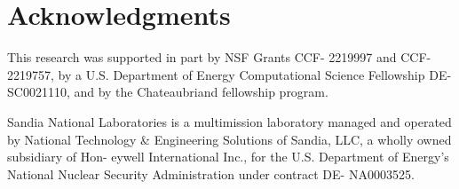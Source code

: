 \documentclass[conference]{IEEEtran}
\begin{document}














 \section{Acknowledgments}  
This research was supported in part by NSF Grants CCF-
2219997 and CCF-2219757, by a U.S. Department of Energy
Computational Science Fellowship DE-SC0021110, and by the
Chateaubriand fellowship program.

Sandia National Laboratories is a multimission laboratory
managed and operated by National Technology \& Engineering
Solutions of Sandia, LLC, a wholly owned subsidiary of Hon-
eywell International Inc., for the U.S. Department of Energy’s
National Nuclear Security Administration under contract DE-
NA0003525.




\end{document}
